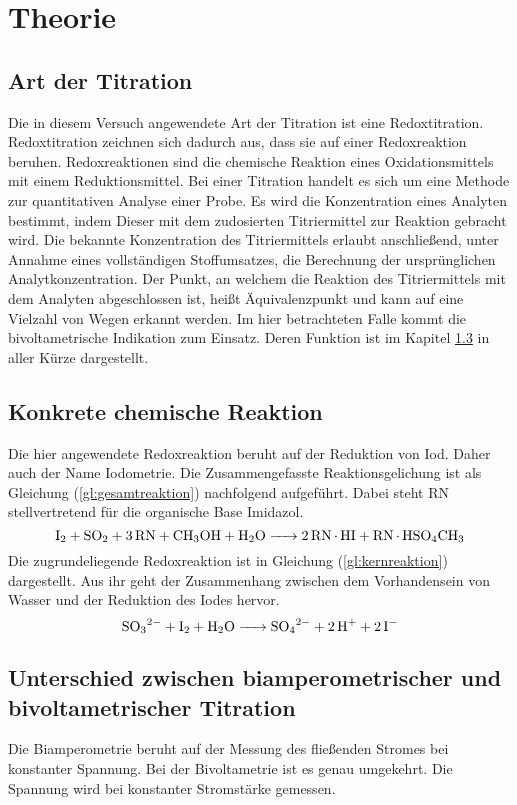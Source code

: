 \section{Theorie}
\label{sec:theorie}

\subsection{Art der Titration}
Die in diesem Versuch angewendete Art der Titration ist eine Redoxtitration. Redoxtitration zeichnen sich dadurch aus, dass sie auf einer Redoxreaktion beruhen. Redoxreaktionen sind die chemische Reaktion eines Oxidationsmittels mit einem Reduktionsmittel.\cite{redoxreaktion} Bei einer Titration handelt es sich um eine Methode zur quantitativen Analyse einer Probe. Es wird die Konzentration eines Analyten bestimmt, indem Dieser mit dem zudosierten Titriermittel zur Reaktion gebracht wird.\cite{titration} Die bekannte Konzentration des Titriermittels erlaubt anschließend, unter Annahme eines vollständigen Stoffumsatzes, die Berechnung der ursprünglichen Analytkonzentration. Der Punkt, an welchem die Reaktion des Titriermittels mit dem Analyten abgeschlossen ist, heißt Äquivalenzpunkt und kann auf eine Vielzahl von Wegen erkannt werden. Im hier betrachteten Falle kommt die bivoltametrische Indikation zum Einsatz. Deren Funktion ist  im Kapitel  \ref{sec:unterschiedBivoltBiamp} in aller Kürze dargestellt.
\subsection{Konkrete chemische Reaktion}
Die hier angewendete Redoxreaktion beruht auf der Reduktion von Iod. Daher auch der Name Iodometrie. Die Zusammengefasste Reaktionsgelichung ist als Gleichung (\ref{gl:gesamtreaktion}) nachfolgend aufgeführt. Dabei steht RN stellvertretend für die organische Base Imidazol. 
\begin{equation}\label{gl:gesamtreaktion}
	\ce{I2 + SO2 + 3 RN + CH3OH + H2O -> 2RN*HI + RN*HSO4CH3}
\end{equation}
Die zugrundeliegende Redoxreaktion ist in Gleichung (\ref{gl:kernreaktion}) dargestellt. Aus ihr geht der Zusammenhang zwischen dem Vorhandensein von Wasser und der Reduktion des Iodes hervor.
\begin{equation}\label{gl:kernreaktion}
	\ce{SO3^2- +I2 +H2O -> SO4^2- + 2H^+ +2I-}
\end{equation}
\subsection{Unterschied zwischen biamperometrischer und bivoltametrischer Titration}\label{sec:unterschiedBivoltBiamp}

Die Biamperometrie beruht auf der Messung des fließenden Stromes bei konstanter Spannung. Bei der Bivoltametrie ist es genau umgekehrt. Die Spannung wird bei konstanter Stromstärke gemessen.\cite{biamperometrie}\cite{bivoltametrie}

